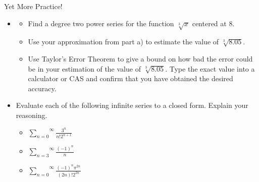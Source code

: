 \begin{exercise}{Yet More Practice! \Coffeecup \Coffeecup \Coffeecup}
\begin{itemize}

\item \begin{itemize} \item Find a degree two power series for the function $ \sqrt[3]{x} $ centered at 8. 
 
\vspace*{2in}

\item Use your approximation from part a) to estimate the value of $\sqrt[3]{8.05}$.

\vspace*{2in}

\item Use Taylor's Error Theorem to give a bound on how bad the error could be in your estimation of the value of $\sqrt[3]{8.05}$.  Type the exact value into a calculator or CAS and confirm that you have obtained the desired accuracy.

\vspace*{2in}

\end{itemize}

\item Evaluate each of the following infinite series to a closed form.  Explain your reasoning. \begin{itemize}
\item  $ \overset{\infty}{\underset{n=0}{\sum}} \frac{3^n}{n!2^{n+1}}$

\vspace*{1.5in}

\item $ \overset{\infty}{\underset{n=3}{\sum}} \frac{(-1)^n}{n} $

\vspace*{1.5in}

\item $ \overset{\infty}{\underset{n=0}{\sum}} \frac{(-1)^{n}\pi^{2n}}{(2n)!2^{2n}} $

\vspace*{1.5in}

\end{itemize}

\end{itemize}
\end{exercise}
